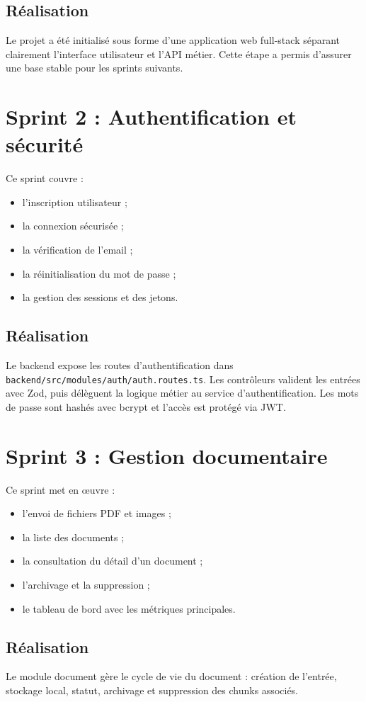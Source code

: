 \documentclass[12pt,a4paper]{report}
\begin{document}
\subsection{Réalisation}
Le projet a été initialisé sous forme d'une application web full-stack séparant clairement l'interface utilisateur et l'API métier. Cette étape a permis d'assurer une base stable pour les sprints suivants.

\section{Sprint 2 : Authentification et sécurité}
Ce sprint couvre :
\begin{itemize}
  \item l'inscription utilisateur ;
  \item la connexion sécurisée ;
  \item la vérification de l'email ;
  \item la réinitialisation du mot de passe ;
  \item la gestion des sessions et des jetons.
\end{itemize}

\subsection{Réalisation}
Le backend expose les routes d'authentification dans \texttt{backend/src/modules/auth/auth.routes.ts}. Les contrôleurs valident les entrées avec Zod, puis délèguent la logique métier au service d'authentification. Les mots de passe sont hashés avec bcrypt et l'accès est protégé via JWT.

\section{Sprint 3 : Gestion documentaire}
Ce sprint met en œuvre :
\begin{itemize}
  \item l'envoi de fichiers PDF et images ;
  \item la liste des documents ;
  \item la consultation du détail d'un document ;
  \item l'archivage et la suppression ;
  \item le tableau de bord avec les métriques principales.
\end{itemize}

\subsection{Réalisation}
Le module document gère le cycle de vie du document : création de l'entrée, stockage local, statut, archivage et suppression des chunks associés.
\end{document}
